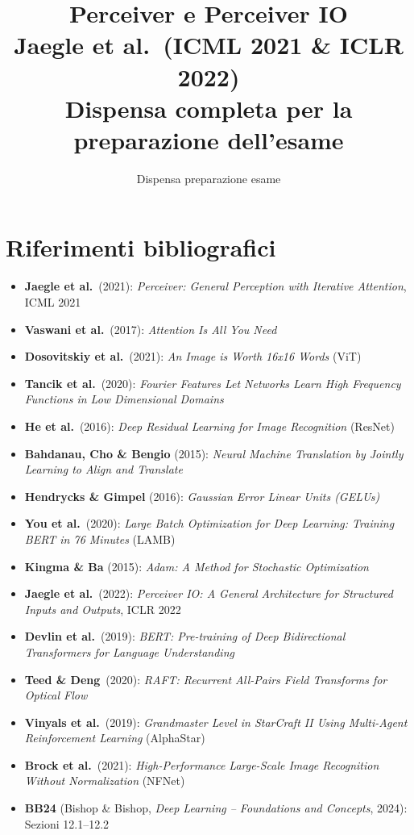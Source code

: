 \documentclass[12pt,a4paper]{article}
\title{\Huge\textbf{Perceiver e Perceiver IO}\\\vspace{0.5cm}\LARGE Jaegle et al.\ (ICML 2021 \& ICLR 2022)\\\vspace{0.3cm}\large Dispensa completa per la preparazione dell'esame}
\author{Dispensa preparazione esame}
\date{}
\begin{document}
\maketitle

\section*{Riferimenti bibliografici}
\begin{itemize}[leftmargin=*]
    \item \textbf{Jaegle et al.}\ (2021): \textit{Perceiver: General Perception with Iterative Attention}, ICML 2021
    \item \textbf{Vaswani et al.}\ (2017): \textit{Attention Is All You Need}
    \item \textbf{Dosovitskiy et al.}\ (2021): \textit{An Image is Worth 16x16 Words} (ViT)
    \item \textbf{Tancik et al.}\ (2020): \textit{Fourier Features Let Networks Learn High Frequency Functions in Low Dimensional Domains}
    \item \textbf{He et al.}\ (2016): \textit{Deep Residual Learning for Image Recognition} (ResNet)
    \item \textbf{Bahdanau, Cho \& Bengio} (2015): \textit{Neural Machine Translation by Jointly Learning to Align and Translate}
    \item \textbf{Hendrycks \& Gimpel} (2016): \textit{Gaussian Error Linear Units (GELUs)}
    \item \textbf{You et al.}\ (2020): \textit{Large Batch Optimization for Deep Learning: Training BERT in 76 Minutes} (LAMB)
    \item \textbf{Kingma \& Ba} (2015): \textit{Adam: A Method for Stochastic Optimization}
    \item \textbf{Jaegle et al.}\ (2022): \textit{Perceiver IO: A General Architecture for Structured Inputs and Outputs}, ICLR 2022
    \item \textbf{Devlin et al.}\ (2019): \textit{BERT: Pre-training of Deep Bidirectional Transformers for Language Understanding}
    \item \textbf{Teed \& Deng}\ (2020): \textit{RAFT: Recurrent All-Pairs Field Transforms for Optical Flow}
    \item \textbf{Vinyals et al.}\ (2019): \textit{Grandmaster Level in StarCraft II Using Multi-Agent Reinforcement Learning} (AlphaStar)
    \item \textbf{Brock et al.}\ (2021): \textit{High-Performance Large-Scale Image Recognition Without Normalization} (NFNet)
    \item \textbf{BB24} (Bishop \& Bishop, \textit{Deep Learning -- Foundations and Concepts}, 2024): Sezioni 12.1--12.2
\end{itemize}
\end{document}
